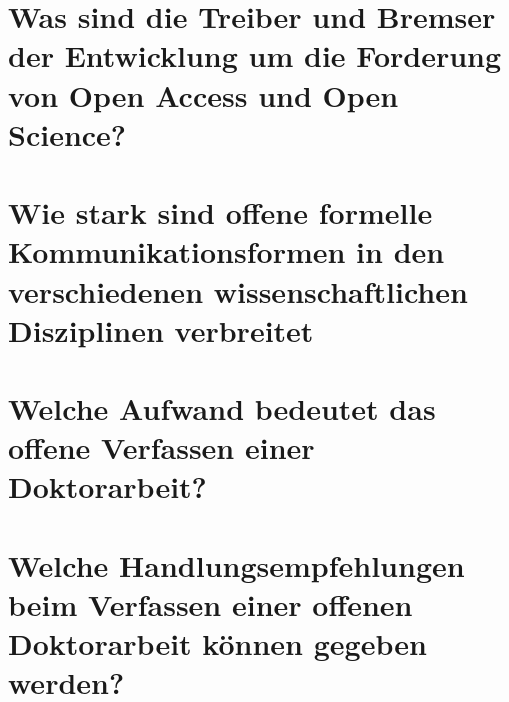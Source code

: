 \section{Was sind die Treiber und Bremser der Entwicklung um die Forderung von Open Access und Open Science?} 

\section{Wie stark sind offene formelle Kommunikationsformen in den verschiedenen wissenschaftlichen Disziplinen verbreitet}  
\section{Welche Aufwand bedeutet das offene Verfassen einer Doktorarbeit?} 
\section{Welche Handlungsempfehlungen beim Verfassen einer offenen Doktorarbeit können gegeben werden?} 